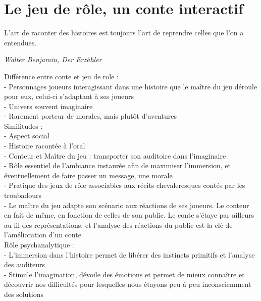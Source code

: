 \section{Le jeu de rôle, un conte interactif}

\begin{shadequote}
L'art de raconter des histoires est toujours l'art de reprendre celles que l'on a entendues. \par\emph{Walter Benjamin, Der Erzähler}
\end{shadequote}


Différence entre conte et jeu de role : \\
- Personnages joueurs interagissant dans une histoire que le maître du jeu déroule pour eux, celui-ci s'adaptant à ses joueurs\\
- Univers souvent imaginaire\\
- Rarement porteur de morales, mais plutôt d'aventures\\


Similitudes :\\
- Aspect social\\
- Histoire racontée à l'oral\\
- Conteur et Maître du jeu : transporter son auditoire dans l'imaginaire\\
- Rôle essentiel de l'ambiance instaurée afin de maximiser l'immersion, et éventuellement de faire passer un message, une morale\\
- Pratique des jeux de rôle associables aux récits chevaleresques contés par les troubadours\\
- Le maître du jeu adapte son scénario aux réactions de ses joueurs. Le conteur en fait de même, en fonction de celles de son public. Le conte s'étaye par ailleurs au fil des représentations, et l'analyse des réactions du public est la clé de l'amélioration d'un conte\\

Rôle psychanalytique :\\
- L'immersion dans l'histoire permet de libérer des instincts primitifs et l'analyse des auditeurs\\
- Stimule l'imagination, dévoile des émotions et permet de mieux connaître et découvrir nos difficultés pour lesquelles nous étayons peu à peu inconsciemment des solutions\\

\clearpage
